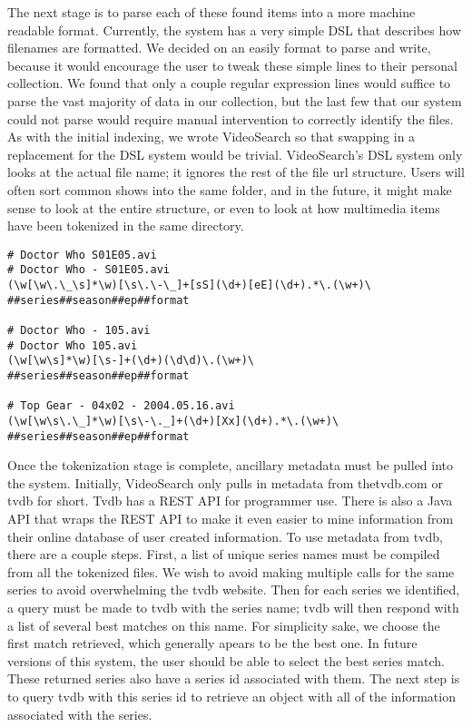 \documentclass{acm_proc_article-sp}
\begin{document}
The next stage is to parse each of these found items into a more machine readable format.  Currently, the system has a very simple DSL that describes how filenames are formatted.  We decided on an easily format to parse and write, because it would encourage the user to tweak these simple lines to their personal collection.  \cite{wall2000programming} We found that only a couple regular expression lines would suffice to parse the vast majority of data in our collection, but the last few that our system could not parse would require manual intervention to correctly identify the files.  As with the initial indexing, we wrote VideoSearch so that swapping in a replacement for the DSL system would be trivial.  VideoSearch\textquoteright s DSL system only looks at the actual file name; it ignores the rest of the file url structure.  Users will often sort common shows into the same folder, and in the future, it might make sense to look at the entire structure, or even to look at how multimedia items have been tokenized in the same directory.
\begin{verbatim}
# Doctor Who S01E05.avi
# Doctor Who - S01E05.avi
(\w[\w\.\_\s]*\w)[\s\.\-\_]+[sS](\d+)[eE](\d+).*\.(\w+)\
##series##season##ep##format

# Doctor Who - 105.avi
# Doctor Who 105.avi
(\w[\w\s]*\w)[\s-]+(\d+)(\d\d)\.(\w+)\
##series##season##ep##format

# Top Gear - 04x02 - 2004.05.16.avi
(\w[\w\s\.\_]*\w)[\s\-\._]+(\d+)[Xx](\d+).*\.(\w+)\
##series##season##ep##format
\end{verbatim}
Once the tokenization stage is complete, ancillary metadata must be pulled into the system.  Initially, VideoSearch only pulls in metadata from thetvdb.com or tvdb for short.  Tvdb has a REST API for programmer use. \cite{tvdb} There is also a Java API that wraps the REST API to make it even easier to mine information from their online database of user created information.  To use metadata from tvdb, there are a couple steps.  First, a list of unique series names must be compiled from all the tokenized files.  We wish to avoid making multiple calls for the same series to avoid overwhelming the tvdb website. Then for each series we identified, a query must be made to tvdb with the series name; tvdb will then respond with a list of several best matches on this name.  For simplicity sake, we choose the first match retrieved, which generally apears to be the best one. In future versions of this system, the user should be able to select the best series match.  These returned series also have a series id associated with them.  The next step is to query tvdb with this series id to retrieve an object with all of the information associated with the series.
\end{document}
